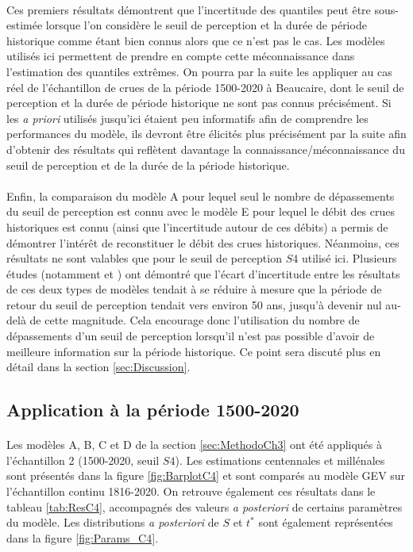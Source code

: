 	\paragraph{} Ces premiers résultats démontrent que l'incertitude des quantiles peut être sous-estimée lorsque l'on considère le seuil de perception et la durée de période historique comme étant bien connus alors que ce n'est pas le cas. Les modèles utilisés ici permettent de prendre en compte cette méconnaissance dans l'estimation des quantiles extrêmes. On pourra par la suite les appliquer au cas réel de l'échantillon de crues de la période 1500-2020 à Beaucaire, dont le seuil de perception et la durée de période historique ne sont pas connus précisément. Si les \textit{a priori} utilisés jusqu'ici étaient peu informatifs afin de comprendre les performances du modèle, ils devront être élicités plus précisément par la suite afin d'obtenir des résultats qui reflètent davantage la connaissance/méconnaissance du seuil de perception et de la durée de la période historique.
		
	\paragraph{} Enfin, la comparaison du modèle A pour lequel seul le nombre de dépassements du seuil de perception est connu avec le modèle E pour lequel le débit des crues historiques est connu (ainsi que l'incertitude autour de ces débits) a permis de démontrer l'intérêt de reconstituer le débit des crues historiques. Néanmoins, ces résultats ne sont valables que pour le seuil de perception $S4$ utilisé ici. Plusieurs études (notamment \citet{stedinger_flood_1986} et \citet{payrastre_usefulness_2011}) ont démontré que l'écart d'incertitude entre les résultats de ces deux types de modèles tendait à se réduire à mesure que la période de retour du seuil de perception tendait vers environ 50 ans, jusqu'à devenir nul au-delà de cette magnitude. Cela encourage donc l'utilisation du nombre de dépassements d'un seuil de perception lorsqu'il n'est pas possible d'avoir de meilleure information sur la période historique. Ce point sera discuté plus en détail dans la section \ref{sec:Discussion}.
	
\newpage
	\subsection{Application à la période 1500-2020}
	\label{subsec:Results1500}
	
	\paragraph{} Les modèles A, B, C et D de la section \ref{sec:MethodoCh3} ont été appliqués à l'échantillon 2 (1500-2020, seuil $S4$). Les estimations centennales et millénales sont présentés dans la figure \ref{fig:BarplotC4} et sont comparés au modèle GEV sur l'échantillon continu 1816-2020. On retrouve également ces résultats dans le tableau \ref{tab:ResC4}, accompagnés des valeurs \textit{a posteriori} de certains paramètres du modèle. Les distributions \textit{a posteriori} de $S$ et $t^{*}$ sont également représentées dans la figure \ref{fig:Params_C4}.
	
